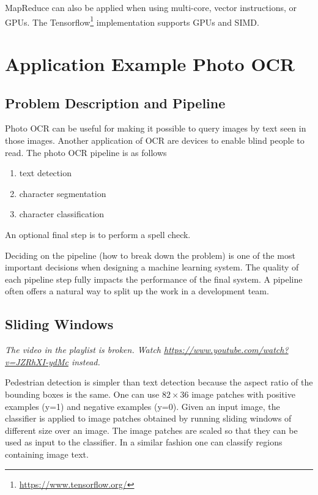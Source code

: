 \documentclass[a4paper,twoside,10pt]{article}
\begin{document}
MapReduce can also be applied when using multi-core, vector instructions, or \acp{GPU}.
The Tensorflow\footnote{\url{https://www.tensorflow.org/}} implementation supports \acp{GPU} and \ac{SIMD}.

\section{Application Example Photo OCR}
\subsection{Problem Description and Pipeline}
Photo \ac{OCR} can be useful for making it possible to query images by text seen in those images.
Another application of \ac{OCR} are devices to enable blind people to read.
The photo \ac{OCR} pipeline is as follows
\begin{enumerate}
  \item text detection
  \item character segmentation
  \item character classification
\end{enumerate}
An optional final step is to perform a spell check.

Deciding on the pipeline (how to break down the problem) is one of the most important decisions when designing a machine learning system.
The quality of each pipeline step fully impacts the performance of the final system.
A pipeline often offers a natural way to split up the work in a development team.

\subsection{Sliding Windows}
\begin{footnotesize}
\emph{The video in the playlist is broken. Watch \url{https://www.youtube.com/watch?v=JZRhXI-ydMc} instead.}
\end{footnotesize}

Pedestrian detection is simpler than text detection because the aspect ratio of the bounding boxes is the same.
One can use $82\times36$ image patches with positive examples (y=1) and negative examples (y=0).
Given an input image, the classifier is applied to image patches obtained by running sliding windows of different size over an image.
The image patches are scaled so that they can be used as input to the classifier.
In a similar fashion one can classify regions containing image text.
\end{document}
